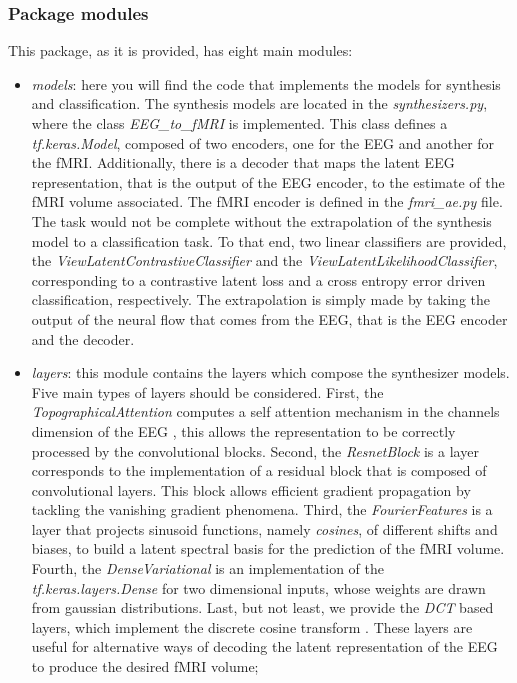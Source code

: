 \subsubsection{Package modules}\label{section:modules}

This package, as it is provided, has eight main modules:
\begin{itemize}
    \item \textit{models}: here you will find the code that implements the models for synthesis and classification. The synthesis models are located in the \textit{synthesizers.py}, where the class \textit{EEG\_to\_fMRI} is implemented. This class defines a \textit{tf.keras.Model}, composed of two encoders, one for the EEG and another for the fMRI. Additionally, there is a decoder that maps the latent EEG representation, that is the output of the EEG encoder, to the estimate of the fMRI volume associated. The fMRI encoder is defined in the \textit{fmri\_ae.py} file. The task would not be complete without the extrapolation of the synthesis model to a classification task. To that end, two linear classifiers are provided, the \textit{ViewLatentContrastiveClassifier} and the \textit{ViewLatentLikelihoodClassifier}, corresponding to a contrastive latent loss and a cross entropy error driven classification, respectively. The extrapolation is simply made by taking the output of the neural flow that comes from the EEG, that is the EEG encoder and the decoder.
    \item \textit{layers}: this module contains the layers which compose the synthesizer models. Five main types of layers should be considered. First, the \textit{TopographicalAttention} computes a self attention mechanism in the channels dimension of the EEG \cite{calhas2022eeg}, this allows the representation to be correctly processed by the convolutional blocks. Second, the \textit{ResnetBlock} \cite{he2016deep} is a layer corresponds to the implementation of a residual block that is composed of convolutional layers. This block allows efficient gradient propagation by tackling the vanishing gradient phenomena. Third, the \textit{FourierFeatures} is a layer that projects sinusoid functions, namely \textit{cosines}, of different shifts and biases, to build a latent spectral basis for the prediction of the fMRI volume. Fourth, the \textit{DenseVariational} is an implementation of the \textit{tf.keras.layers.Dense} for two dimensional inputs, whose weights are drawn from gaussian distributions. Last, but not least, we provide the \textit{DCT} based layers, which implement the discrete cosine transform \cite{ahmed1974discrete}. These layers are useful for alternative ways of decoding the latent representation of the EEG to produce the desired fMRI volume;

\end{itemize}
